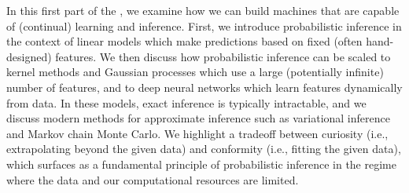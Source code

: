 In this first part of the \course, we examine how we can build machines that are capable of (continual) learning and inference.
First, we introduce probabilistic inference in the context of linear models which make predictions based on fixed (often hand-designed) features.
We then discuss how probabilistic inference can be scaled to kernel methods and Gaussian processes which use a large (potentially infinite) number of features, and to deep neural networks which learn features dynamically from data.
In these models, exact inference is typically intractable, and we discuss modern methods for approximate inference such as variational inference and Markov chain Monte Carlo.
We highlight a tradeoff between curiosity (i.e., extrapolating beyond the given data) and conformity (i.e., fitting the given data), which surfaces as a fundamental principle of probabilistic inference in the regime where the data and our computational resources are limited.

